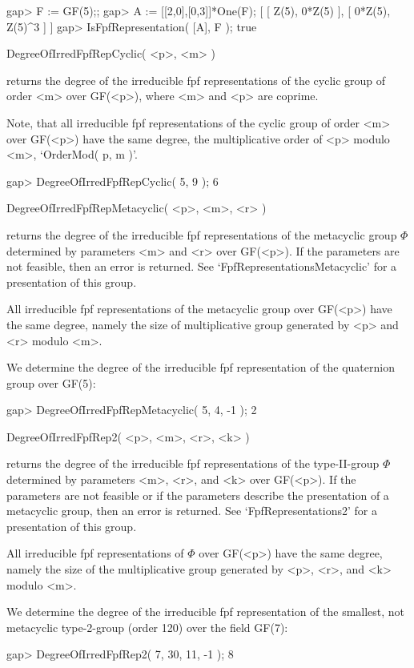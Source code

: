 \beginexample
    gap> F := GF(5);;
    gap> A := [[2,0],[0,3]]*One(F);
    [ [ Z(5), 0*Z(5) ], [ 0*Z(5), Z(5)^3 ] ]
    gap> IsFpfRepresentation( [A], F );
    true
\endexample

\>DegreeOfIrredFpfRepCyclic( <p>, <m> )

returns the degree of the irreducible fpf representations of
the cyclic group of order <m> over GF(<p>), where <m> and <p> are coprime.

Note, that all irreducible fpf representations of the cyclic group
of order <m> over GF(<p>) have the same degree, the multiplicative order 
of <p> modulo <m>, `OrderMod( p, m )'.

\beginexample
    gap> DegreeOfIrredFpfRepCyclic( 5, 9 );
    6
\endexample
 
\>DegreeOfIrredFpfRepMetacyclic( <p>, <m>, <r> )

returns the degree of the irreducible fpf representations of
the metacyclic group $\Phi$ determined by parameters <m> and <r> over
GF(<p>). If the parameters are not feasible, then an error is returned.
See `FpfRepresentationsMetacyclic' for a presentation of this
group.

All irreducible fpf representations of the metacyclic group
over GF(<p>) have the same degree, namely the size of multiplicative group
generated by <p> and <r> modulo <m>.

We determine the degree of the irreducible fpf representation of the 
quaternion group over GF(5):
 
\beginexample
    gap> DegreeOfIrredFpfRepMetacyclic( 5, 4, -1 );
    2
\endexample
 

\>DegreeOfIrredFpfRep2( <p>, <m>, <r>, <k> )

returns the degree of the irreducible fpf representations of
the type-II-group $\Phi$ determined by parameters <m>, <r>, and <k> over
GF(<p>). If the parameters are not feasible or if the parameters describe
the presentation of a metacyclic group, then an error is returned.
See `FpfRepresentations2' for a presentation of this group.

All irreducible fpf representations of $\Phi$ over GF(<p>) have
the same degree, namely the size of the multiplicative group
generated by <p>, <r>, and <k> modulo <m>.

We determine the degree of the irreducible fpf representation of the smallest,
not metacyclic type-2-group (order 120) over the field GF(7): 
 
\beginexample
    gap> DegreeOfIrredFpfRep2( 7, 30, 11, -1 );    
    8
\endexample
 
